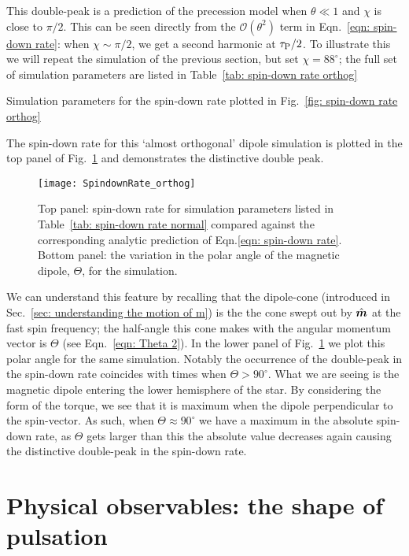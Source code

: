 \documentclass[../full_thesis/full_thesis.tex]{subfiles}
\newcommand{\thisdir}{../inertial_frame}
\begin{document}
This double-peak is a prediction of the precession model when $\theta \ll 1$
and $\chi$ is close to $\pi/2$. This can be seen directly from the
$\mathcal{O}(\theta^{2})$ term in Eqn.~\eqref{eqn: spin-down rate}: when $\chi
\sim \pi/2$, we get a second harmonic at $\tau_{\mathrm{P}}/2$. To illustrate this we will
repeat the simulation of the previous section, but set $\chi=88^{\circ}$; the
full set of simulation parameters are listed in Table~\ref{tab: spin-down rate
orthog}
\begin{table}[htb]
\centering

\caption{Simulation parameters for the spin-down rate plotted in Fig.~\ref{fig:
spin-down rate orthog}}
\label{tab: spin-down rate orthog}
\end{table}
The spin-down rate for this `almost orthogonal' dipole simulation is plotted
in the top panel of Fig.~\ref{fig: spin-down rate orthog} and demonstrates the
distinctive double peak.
\begin{figure}[htb]
\centering
\texttt{[image: SpindownRate\_orthog]}
\caption{Top panel: spin-down rate for simulation parameters listed in Table~\ref{tab:
spin-down rate normal} compared against the corresponding analytic prediction
of Eqn.\eqref{eqn: spin-down rate}. Bottom panel: the variation in the polar
angle of the magnetic dipole, $\Theta$, for the simulation.}
\label{fig: spin-down rate orthog}
\end{figure}
We can understand this feature by recalling that the dipole-cone (introduced in
Sec.~\ref{sec: understanding the motion of m}) is the
the cone swept out by $\hat{\boldsymbol{m}}$ at the fast spin frequency; the half-angle this cone
makes with the angular momentum vector is $\Theta$ (see Eqn.~\eqref{eqn: Theta 2}).
In the lower panel of Fig.~\ref{fig: spin-down rate orthog} we plot this polar
angle for the same simulation. Notably the occurrence of the double-peak in the
spin-down rate coincides with times when $\Theta > 90^{\circ}$. What we are seeing
is the magnetic dipole entering the lower hemisphere of the star. By considering
the form of the \citet{Deutsch1955} torque, we see that it is maximum when
the dipole perpendicular to the spin-vector. As such, when $\Theta \approx 90^{\circ}$
we have a maximum in the absolute spin-down rate, as $\Theta$ gets larger than
this the absolute value decreases again causing the distinctive double-peak
in the spin-down rate.


\section{Physical observables: the shape of pulsation}
\end{document}
